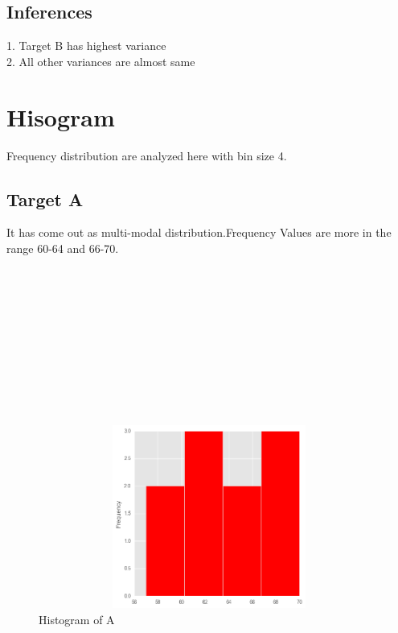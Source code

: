 \documentclass[11pt]{report}
\begin{document}
\subsection{Inferences}
1. Target B has highest variance \\
2. All other variances are almost same\\

\section{Hisogram}
Frequency distribution are analyzed here with bin size 4.
\subsection{Target A}
It has come out as multi-modal distribution.Frequency Values are more in the range 60-64 and 66-70.\\
\\
\\
\\
\\
\\
\\
\\
\\
\\
\\

\begin{figure}[h!]
  \centering
  \includegraphics[height = 6cm, width = 14cm]{A_hist.png}
  \caption{Histogram of A}
  \label{fig:hist_a}
\end{figure}
\end{document}
